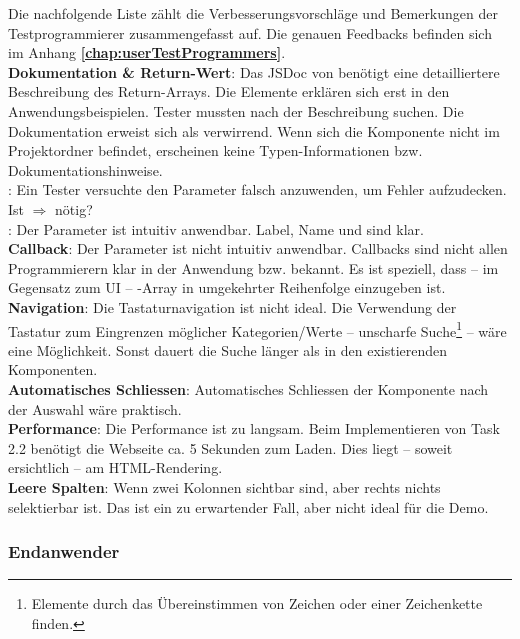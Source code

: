 Die nachfolgende Liste zählt die Verbesserungsvorschläge und Bemerkungen der Testprogrammierer zusammengefasst auf. 
Die genauen Feedbacks befinden sich im Anhang \textbf{\ref{chap:userTestProgrammers}}. 
 \\
\textbf{Dokumentation \& Return-Wert}: 
Das JSDoc von  benötigt eine detailliertere Beschreibung des Return-Arrays. 
Die Elemente erklären sich erst in den Anwendungsbeispielen. 
Tester mussten nach der Beschreibung suchen. 
Die Dokumentation erweist sich als verwirrend. 
Wenn sich die Komponente nicht im Projektordner befindet, erscheinen keine Typen-Informationen bzw. Dokumentationshinweise. 
\\
: 
Ein Tester versuchte den Parameter falsch anzuwenden, um Fehler aufzudecken. 
Ist  $\Rightarrow$  nötig? 
\\
: 
Der Parameter ist intuitiv anwendbar. 
Label, Name und  sind klar. 
\\
\textbf{Callback}: 
Der Parameter ist nicht intuitiv anwendbar. 
Callbacks sind nicht allen Programmierern klar in der Anwendung bzw. bekannt. 
Es ist speziell, dass – im Gegensatz zum UI – -Array in umgekehrter Reihenfolge einzugeben ist. 
\\
\textbf{Navigation}: 
Die Tastaturnavigation ist nicht ideal. 
Die Verwendung der Tastatur zum Eingrenzen möglicher Kategorien/Werte – unscharfe Suche\footnote{
    Elemente durch das Übereinstimmen von Zeichen oder einer Zeichenkette finden.
} – wäre eine Möglichkeit. 
Sonst dauert die Suche länger als in den existierenden Komponenten. 
\\
\textbf{Automatisches Schliessen}: 
Automatisches Schliessen der Komponente nach der Auswahl wäre praktisch. 
\\
\textbf{Performance}: 
Die Performance ist zu langsam. 
Beim Implementieren von Task 2.2 benötigt die Webseite ca. 5 Sekunden zum Laden. 
Dies liegt – soweit ersichtlich – am HTML-Rendering. 
\\
\textbf{Leere Spalten}: 
Wenn zwei Kolonnen sichtbar sind, aber rechts nichts selektierbar ist. 
Das ist ein zu erwartender Fall, aber nicht ideal für die Demo. 


\subsubsection{\color{dblue} Endanwender}
\label{sec:userTestsEnduser}

